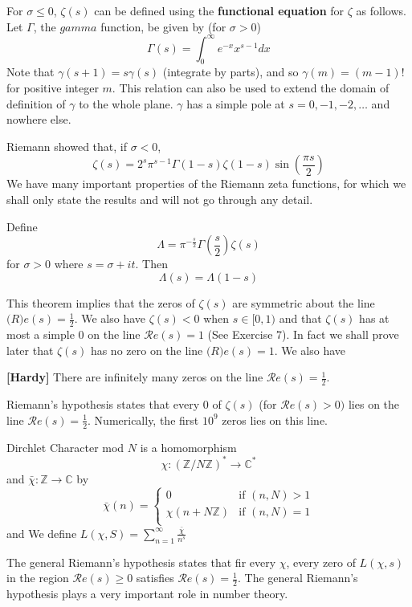 For $\sigma \le 0$, $\zeta(s)$ can be defined using the {\bf functional equation} for $\zeta$ as follows.
Let $\Gamma$, the $gamma$ function, be given by (for $\sigma>0$)
$$\Gamma(s)=\int_0^\infty e^{-x}x^{s-1}dx$$
Note that $\gamma(s+1)=s\gamma(s)$ (integrate by parts), and so $\gamma(m)=(m-1)!$ for positive integer $m$.
This relation can also be used to extend the domain of definition of $\gamma$ to the whole plane. $\gamma$ has a simple pole at $s=0,-1,-2,\ldots$ and nowhere else.

Riemann showed that, if $\sigma<0$,
$$\zeta(s)=2^s \pi^{s-1} \Gamma(1-s)\zeta(1-s)\sin{\left(\frac{\pi s}{2}\right)}$$
We have many important properties of the Riemann zeta functions, for which we shall only state the results and will not go through any detail.
\begin{theorem} Define
$$\Lambda = \pi^{-\frac{s}{2}}\Gamma\left(\frac{s}{2}\right)\zeta(s)$$
for $\sigma >0$ where $s=\sigma+it$. Then
$$\Lambda(s)=\Lambda(1-s)$$
\end{theorem}
This theorem implies that the zeros of $\zeta(s)$ are symmetric about the line $\mathcal(R)e(s)=\frac{1}{2}$.
We also have $\zeta(s) <0$ when $s \in [0,1)$ and that $\zeta(s)$ has at most a simple $0$ on the line
$\mathcal{R}e(s)=1$ (See Exercise 7). In fact we shall prove later that $\zeta(s)$ has no zero on the line $\mathcal(R)e(s)=1$.
We also have
\begin{theorem}{\bf [Hardy]}\label{H;Hardy} There are infinitely many zeros on the line $\mathcal{R}e(s)=\frac{1}{2}$.
\end{theorem}
Riemann's hypothesis states that every $0$ of $\zeta(s)$ (for $\mathcal{R}e(s)>0)$ lies on the line $\mathcal{R}e(s)=\frac{1}{2}$. Numerically, the first $10^9$ zeros lies on this line.
\begin{definition} Dirchlet Character mod $N$ is a homomorphism
$$\chi: (\mathbb{Z}/N\mathbb{Z})^* \rightarrow \mathbb{C}^*$$
and $\bar{\chi}: \mathbb{Z} \rightarrow \mathbb{C}$ by
\begin{equation*}
\bar{\chi}(n)= \left\{
\begin{array}{ll}
0 & \text{if } (n,N)>1\\
\chi(n+N\mathbb{Z}) & \text{if } (n,N)=1\\
\end{array} \right.
\end{equation*}
and We define $L(\chi,S)=\sum_{n=1}^\infty \frac{\bar{\chi}}{n^s}$
\end{definition}
The general Riemann's hypothesis states that fir every $\chi$, every zero of $L(\chi,s)$ in the region
$\mathcal{R}e(s) \ge 0$ satisfies $\mathcal{R}e(s)=\frac{1}{2}$. The general Riemann's hypothesis plays a very important role in number theory.


